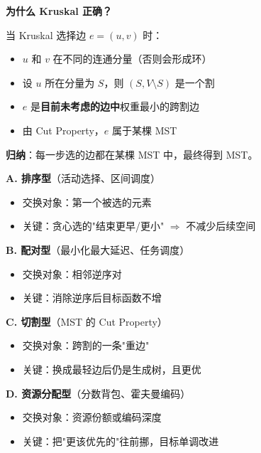 \documentclass[12pt, a4paper]{ctexart}
\begin{document}
\begin{blackboard}

\textbf{为什么 Kruskal 正确？}

当 Kruskal 选择边 $e = (u, v)$ 时：

\begin{itemize}
    \item $u$ 和 $v$ 在不同的连通分量（否则会形成环）
    \item 设 $u$ 所在分量为 $S$，则 $(S, V \setminus S)$ 是一个割
    \item $e$ 是\textbf{目前未考虑的边中}权重最小的跨割边
    \item 由 Cut Property，$e$ 属于某棵 MST
\end{itemize}

\textbf{归纳}：每一步选的边都在某棵 MST 中，最终得到 MST。

\end{blackboard}

\begin{keypoint}[贪心交换论证的四种类型总结]

\textbf{A. 排序型}（活动选择、区间调度）
\begin{itemize}
    \item 交换对象：第一个被选的元素
    \item 关键：贪心选的"结束更早/更小" $\Rightarrow$ 不减少后续空间
\end{itemize}

\textbf{B. 配对型}（最小化最大延迟、任务调度）
\begin{itemize}
    \item 交换对象：相邻逆序对
    \item 关键：消除逆序后目标函数不增
\end{itemize}

\textbf{C. 切割型}（MST 的 Cut Property）
\begin{itemize}
    \item 交换对象：跨割的一条"重边"
    \item 关键：换成最轻边后仍是生成树，且更优
\end{itemize}

\textbf{D. 资源分配型}（分数背包、霍夫曼编码）
\begin{itemize}
    \item 交换对象：资源份额或编码深度
    \item 关键：把"更该优先的"往前挪，目标单调改进
\end{itemize}

\end{keypoint}
\end{document}
